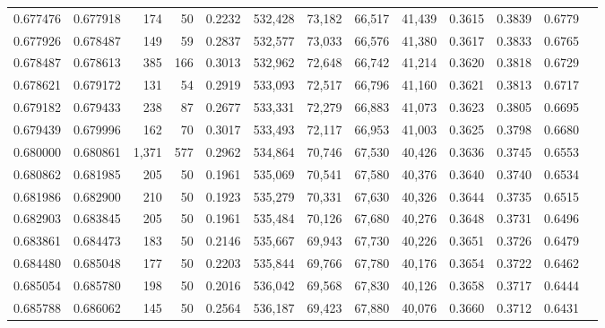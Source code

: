\begin{tabular}{rrrrrrrrrrrrr}
0.677476 & 0.677918 &   174 &  50 &                                     0.2232 & 532,428 &  73,182 &  66,517 &  41,439 & 0.3615 & 0.3839 & 0.6779 \\
0.677926 & 0.678487 &   149 &  59 &                                     0.2837 & 532,577 &  73,033 &  66,576 &  41,380 & 0.3617 & 0.3833 & 0.6765 \\
0.678487 & 0.678613 &   385 & 166 &                                     0.3013 & 532,962 &  72,648 &  66,742 &  41,214 & 0.3620 & 0.3818 & 0.6729 \\
0.678621 & 0.679172 &   131 &  54 &                                     0.2919 & 533,093 &  72,517 &  66,796 &  41,160 & 0.3621 & 0.3813 & 0.6717 \\
0.679182 & 0.679433 &   238 &  87 &                                     0.2677 & 533,331 &  72,279 &  66,883 &  41,073 & 0.3623 & 0.3805 & 0.6695 \\
0.679439 & 0.679996 &   162 &  70 &                                     0.3017 & 533,493 &  72,117 &  66,953 &  41,003 & 0.3625 & 0.3798 & 0.6680 \\
0.680000 & 0.680861 & 1,371 & 577 &                                     0.2962 & 534,864 &  70,746 &  67,530 &  40,426 & 0.3636 & 0.3745 & 0.6553 \\
0.680862 & 0.681985 &   205 &  50 &                                     0.1961 & 535,069 &  70,541 &  67,580 &  40,376 & 0.3640 & 0.3740 & 0.6534 \\
0.681986 & 0.682900 &   210 &  50 &                                     0.1923 & 535,279 &  70,331 &  67,630 &  40,326 & 0.3644 & 0.3735 & 0.6515 \\
0.682903 & 0.683845 &   205 &  50 &                                     0.1961 & 535,484 &  70,126 &  67,680 &  40,276 & 0.3648 & 0.3731 & 0.6496 \\
0.683861 & 0.684473 &   183 &  50 &                                     0.2146 & 535,667 &  69,943 &  67,730 &  40,226 & 0.3651 & 0.3726 & 0.6479 \\
0.684480 & 0.685048 &   177 &  50 &                                     0.2203 & 535,844 &  69,766 &  67,780 &  40,176 & 0.3654 & 0.3722 & 0.6462 \\
0.685054 & 0.685780 &   198 &  50 &                                     0.2016 & 536,042 &  69,568 &  67,830 &  40,126 & 0.3658 & 0.3717 & 0.6444 \\
0.685788 & 0.686062 &   145 &  50 &                                     0.2564 & 536,187 &  69,423 &  67,880 &  40,076 & 0.3660 & 0.3712 & 0.6431 \\

\end{tabular}
